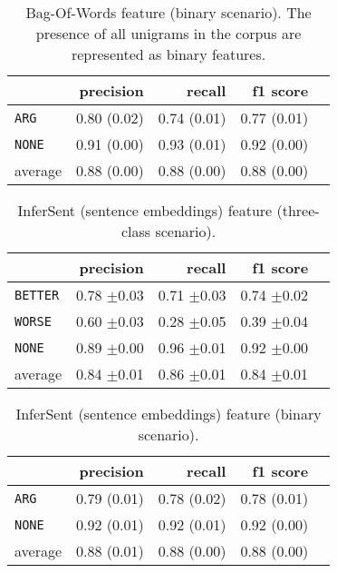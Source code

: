 	
	\begin{table}[h] 
		\centering 
		\caption{Bag-Of-Words feature (binary scenario). The presence of all unigrams in the corpus are represented as binary features.} 
		\label{  }
		\begin{tabular}{@{}lrrrr@{}}
			\toprule
			        & precision                & recall                   & f1 score                 \\ \midrule 
			\texttt{ARG}     & 0.80 \scriptsize{(0.02)} & 0.74 \scriptsize{(0.01)} & 0.77 \scriptsize{(0.01)} \\ 
			\texttt{NONE}    & 0.91 \scriptsize{(0.00)} & 0.93 \scriptsize{(0.01)} & 0.92 \scriptsize{(0.00)} \\ 
			average & 0.88 \scriptsize{(0.00)} & 0.88 \scriptsize{(0.00)} & 0.88 \scriptsize{(0.00)} \\ 
			\bottomrule
		\end{tabular}
	\end{table}
	
	
	\begin{table}[h] 
		\centering 
		\caption{InferSent (sentence embeddings) feature (three-class scenario).} 
		\label{  }
		\begin{tabular}{@{}lrrrr@{}}
			\toprule
			        & precision                & recall                   & f1 score                 \\ \midrule 
\texttt	{BETTER}	&	 0.78 \scriptsize{$\pm$0.03} &	 0.71 \scriptsize{$\pm$0.03} &	 0.74 \scriptsize{$\pm$0.02}  \\ 
\texttt	{WORSE}	&	 0.60 \scriptsize{$\pm$0.03} &	 0.28 \scriptsize{$\pm$0.05} &	 0.39 \scriptsize{$\pm$0.04}  \\ 
\texttt	{NONE}	&	 0.89 \scriptsize{$\pm$0.00} &	 0.96 \scriptsize{$\pm$0.01} &	 0.92 \scriptsize{$\pm$0.00}  \\ 
average	&	 0.84 \scriptsize{$\pm$0.01} &	 0.86 \scriptsize{$\pm$0.01} &	 0.84 \scriptsize{$\pm$0.01}  \\ 
			\bottomrule
		\end{tabular}
	\end{table}
	
	\begin{table}[h] 
		\centering 
		\caption{InferSent (sentence embeddings) feature (binary scenario).} 
		\label{  }
		\begin{tabular}{@{}lrrrr@{}}
			\toprule
			        & precision                & recall                   & f1 score                 \\ \midrule 
			\texttt{ARG}     & 0.79 \scriptsize{(0.01)} & 0.78 \scriptsize{(0.02)} & 0.78 \scriptsize{(0.01)} \\ 
			\texttt{NONE}    & 0.92 \scriptsize{(0.01)} & 0.92 \scriptsize{(0.01)} & 0.92 \scriptsize{(0.00)} \\ 
			average & 0.88 \scriptsize{(0.01)} & 0.88 \scriptsize{(0.00)} & 0.88 \scriptsize{(0.00)} \\ 
			\bottomrule
		\end{tabular}
	\end{table}
	
